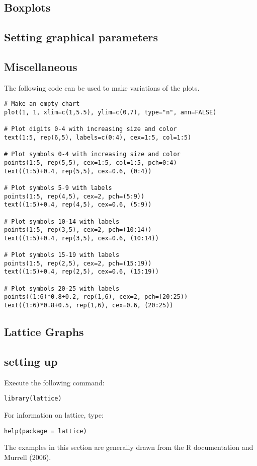 \documentclass[a4paper,12pt]{article}
\begin{document}
\subsection{Boxplots}
\subsection{Setting graphical parameters}
\subsection{Miscellaneous}
The following code can be used to make variations of the plots.

\begin{myindentpar}{1cm}
\footnotesize \begin{verbatim}
# Make an empty chart
plot(1, 1, xlim=c(1,5.5), ylim=c(0,7), type="n", ann=FALSE)

# Plot digits 0-4 with increasing size and color
text(1:5, rep(6,5), labels=c(0:4), cex=1:5, col=1:5)

# Plot symbols 0-4 with increasing size and color
points(1:5, rep(5,5), cex=1:5, col=1:5, pch=0:4)
text((1:5)+0.4, rep(5,5), cex=0.6, (0:4))

# Plot symbols 5-9 with labels
points(1:5, rep(4,5), cex=2, pch=(5:9))
text((1:5)+0.4, rep(4,5), cex=0.6, (5:9))

# Plot symbols 10-14 with labels
points(1:5, rep(3,5), cex=2, pch=(10:14))
text((1:5)+0.4, rep(3,5), cex=0.6, (10:14))

# Plot symbols 15-19 with labels
points(1:5, rep(2,5), cex=2, pch=(15:19))
text((1:5)+0.4, rep(2,5), cex=0.6, (15:19))

# Plot symbols 20-25 with labels
points((1:6)*0.8+0.2, rep(1,6), cex=2, pch=(20:25))
text((1:6)*0.8+0.5, rep(1,6), cex=0.6, (20:25))
\end{verbatim}\normalsize
\end{myindentpar}

\subsection{Lattice Graphs}
\subsection{setting up}
Execute the following command:
\begin{myindentpar}{1cm}
\begin{verbatim}
library(lattice)
\end{verbatim}
\end{myindentpar}
For information on lattice, type:
\begin{myindentpar}{1cm}
\begin{verbatim}
help(package = lattice)
\end{verbatim}
\end{myindentpar}
The examples in this section are generally drawn from the R documentation and Murrell (2006).
\end{document}

